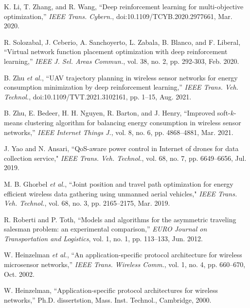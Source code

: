 \documentclass[journal]{IEEEtran}
\begin{document}
\begin{thebibliography}{1}
     {K. Li, T. Zhang, and R. Wang, ``Deep reinforcement learning for multi-objective optimization,'' \emph{IEEE Trans. Cybern.}, doi:10.1109/TCYB.2020.2977661, Mar. 2020.}



     {R. Solozabal, J. Ceberio, A. Sanchoyerto, L. Zabala, B. Blanco, and F. Liberal, ``Virtual network function placement optimization with deep reinforcement learning,'' \emph{IEEE J. Sel. Areas Commun.}, vol. 38, no. 2, pp. 292-303, Feb. 2020.}





        B. Zhu \emph{et al.}, ``UAV trajectory planning in wireless sensor networks for energy consumption minimization by deep reinforcement learning,'' \emph{IEEE Trans. Veh. Technol.}, doi:10.1109/TVT.2021.3102161, pp. 1--15, Aug. 2021.


        {B. Zhu, E. Bedeer, H. H. Nguyen, R. Barton, and J. Henry, ``Improved soft-$k$-means clustering algorithm for balancing energy consumption in wireless sensor networks,'' \emph{IEEE Internet Things J.}, vol. 8, no. 6, pp. 4868--4881, Mar. 2021.}


        J. Yao and N. Ansari, ``QoS-aware power control in Internet of drones for data collection service," \emph{IEEE Trans. Veh. Technol.}, vol. 68, no. 7, pp. 6649--6656, Jul. 2019.


        M. B. Ghorbel \emph{et al.}, ``Joint position and travel path optimization for energy efficient wireless data gathering using unmanned aerial vehicles," \emph{IEEE Trans. Veh. Technol.}, vol. 68, no. 3, pp. 2165--2175, Mar. 2019.



        R. Roberti and P. Toth, ``Models and algorithms for the asymmetric traveling salesman problem: an experimental comparison,'' \emph{EURO Journal on Transportation and Logistics}, vol. 1, no. 1, pp. 113--133, Jun. 2012.


        W. Heinzelman \emph{et al.}, ``An application-specific protocol architecture for wireless microsensor networks,'' \emph{IEEE Trans. Wireless Comm.}, vol. 1, no. 4, pp. 660--670, Oct. 2002.

        W. Heinzelman, ``Application-specific protocol architectures for wireless networks,'' Ph.D. dissertstion, Mass. Inst. Technol., Cambridge, 2000.


\end{thebibliography}
\end{document}
